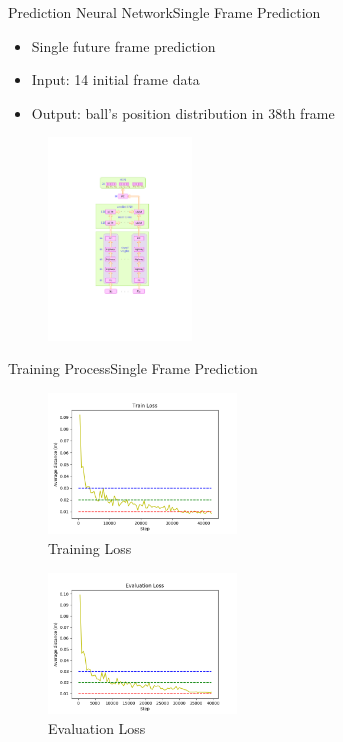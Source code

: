 \documentclass{beamer}
\begin{document}
	\begin{frame}{Prediction Neural Network}{Single Frame Prediction}
	\begin{minipage}{6cm}
	\begin{itemize}
	\item {{\color{magenta}Single} future frame prediction}
	\item {{\color{blue}Input}: 14 initial frame data }
	\item {{\color{blue}Output}: ball's position distribution in 38th frame}
	\end{itemize}
	\end{minipage}
	\begin{minipage}{5cm}
	\begin{figure}
	\includegraphics[width=3.8cm]{s_nn.pdf}
	\end{figure}
	\end{minipage}
	\end{frame}
	
	\begin{frame}{Training Process}{Single Frame Prediction}
	\begin{minipage}{5.5cm}
	\begin{figure}
	\includegraphics[width=5cm]{s_train_loss.png}
	\caption{Training Loss}
	\end{figure}
	\end{minipage}
	\begin{minipage}{5.5cm}
	\begin{figure}
	\includegraphics[width=5cm]{s_eval_loss.png}
	\caption{Evaluation Loss}
	\end{figure}
	\end{minipage}
	\end{frame}
\end{document}
